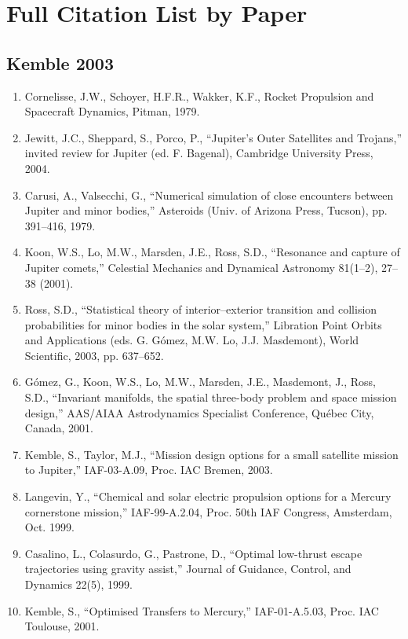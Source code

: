 \documentclass[12pt]{article}
\begin{document}
\section*{Full Citation List by Paper}

\subsection*{Kemble 2003}
\begin{enumerate}
\item Cornelisse, J.W., Schoyer, H.F.R., Wakker, K.F., Rocket Propulsion and Spacecraft Dynamics, Pitman, 1979.
\item Jewitt, J.C., Sheppard, S., Porco, P., ``Jupiter’s Outer Satellites and Trojans,'' invited review for Jupiter (ed. F. Bagenal), Cambridge University Press, 2004.
\item Carusi, A., Valsecchi, G., ``Numerical simulation of close encounters between Jupiter and minor bodies,'' Asteroids (Univ. of Arizona Press, Tucson), pp. 391--416, 1979.
\item Koon, W.S., Lo, M.W., Marsden, J.E., Ross, S.D., ``Resonance and capture of Jupiter comets,'' Celestial Mechanics and Dynamical Astronomy 81(1--2), 27--38 (2001).
\item Ross, S.D., ``Statistical theory of interior--exterior transition and collision probabilities for minor bodies in the solar system,'' Libration Point Orbits and Applications (eds. G. Gómez, M.W. Lo, J.J. Masdemont), World Scientific, 2003, pp. 637--652.
\item Gómez, G., Koon, W.S., Lo, M.W., Marsden, J.E., Masdemont, J., Ross, S.D., ``Invariant manifolds, the spatial three-body problem and space mission design,'' AAS/AIAA Astrodynamics Specialist Conference, Québec City, Canada, 2001.
\item Kemble, S., Taylor, M.J., ``Mission design options for a small satellite mission to Jupiter,'' IAF-03-A.09, Proc. IAC Bremen, 2003.
\item Langevin, Y., ``Chemical and solar electric propulsion options for a Mercury cornerstone mission,'' IAF-99-A.2.04, Proc. 50th IAF Congress, Amsterdam, Oct. 1999.
\item Casalino, L., Colasurdo, G., Pastrone, D., ``Optimal low-thrust escape trajectories using gravity assist,'' Journal of Guidance, Control, and Dynamics 22(5), 1999.
\item Kemble, S., ``Optimised Transfers to Mercury,'' IAF-01-A.5.03, Proc. IAC Toulouse, 2001.
\end{enumerate}
\end{document}

